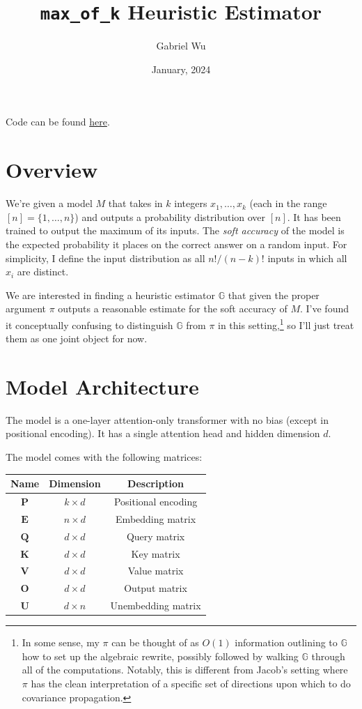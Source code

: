 \documentclass[12pt]{article}
\title{\texttt{max\_of\_k} Heuristic Estimator}
\author{Gabriel Wu}
\date{January, 2024}
\newcommand{\bP}{\mathbf{P}}
\newcommand{\bE}{\mathbf{E}}
\newcommand{\bQ}{\mathbf{Q}}
\newcommand{\bK}{\mathbf{K}}
\newcommand{\bV}{\mathbf{V}}
\newcommand{\bO}{\mathbf{O}}
\newcommand{\bU}{\mathbf{U}}
\begin{document}
\maketitle

\noindent Code can be found \href{https://github.com/GabrielDWu/max_of_n_heuristic_args/blob/b9da731a8204aa9ed7d153d28c88e2a3979a7d59/max_of_n.py}{here}.

\section{Overview}
We're given a model \( M \) that takes in \( k \) integers $x_1, \dots, x_k$ (each in the range \([n] = \{1, \dots, n\}\)) and outputs a probability distribution over \([n]\). It has been trained to output the maximum of its inputs. The \emph{soft accuracy} of the model is the expected probability it places on the correct answer on a random input. For simplicity, I define the input distribution as all $n!/(n-k)!$ inputs in which all $x_i$ are distinct.

We are interested in finding a heuristic estimator \( \mathbb{G} \) that given the proper argument \( \pi \) outputs a reasonable estimate for the soft accuracy of \( M \). I've found it conceptually confusing to distinguish \( \mathbb{G} \) from \( \pi \) in this setting,\footnote{In some sense, my $\pi$ can be thought of as $O(1)$ information outlining to $\mathbb{G}$ how to set up the algebraic rewrite, possibly followed by walking $\mathbb{G}$ through all of the computations. Notably, this is different from Jacob's setting where $\pi$ has the clean interpretation of a specific set of directions upon which to do covariance propagation.} so I'll just treat them as one joint object for now.

\section{Model Architecture}
The model is a one-layer attention-only transformer with no bias (except in positional encoding). It has a single attention head and hidden dimension \( d \).

The model comes with the following matrices:
\begin{center}
\begin{tabular}{|c|c|c|}
\hline
Name & Dimension & Description \\
\hline
\( \bP \) & \( k \times d \) & Positional encoding \\
\( \bE \) & \( n \times d \) & Embedding matrix \\
\( \bQ \) & \( d \times d \) & Query matrix \\
\( \bK \) & \( d \times d \) & Key matrix \\
\( \bV \) & \( d \times d \) & Value matrix \\
\( \bO \) & \( d \times d \) & Output matrix \\
\( \bU \) & \( d \times n \) & Unembedding matrix \\
\hline
\end{tabular}
\end{center}
\end{document}
